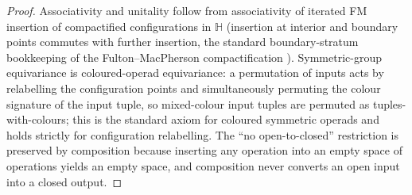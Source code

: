 \begin{proof}
Associativity and unitality follow from associativity of iterated
FM insertion of compactified configurations in $\mathbb H$
(insertion at interior and boundary points commutes with further
insertion, the standard boundary-stratum bookkeeping of the
Fulton--MacPherson compactification \cite{Voronov1998}).
Symmetric-group equivariance is coloured-operad equivariance: a
permutation of inputs acts by relabelling the configuration points
and simultaneously permuting the colour signature of the input
tuple, so mixed-colour input tuples are permuted as tuples-with-colours;
this is the standard axiom for coloured symmetric operads and holds
strictly for configuration relabelling. The ``no open-to-closed''
restriction is preserved by composition because inserting any
operation into an empty space of operations yields an empty space,
and composition never converts an open input into a closed output.
\end{proof}

